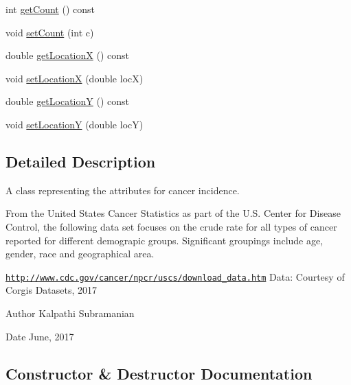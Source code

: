\begin{DoxyCompactItemize}
\item 
int \mbox{\hyperlink{classbridges_1_1_cancer_incidence_a95d3f5e77f0b6e8379e8491a4f700a2d}{get\+Count}} () const
\item 
void \mbox{\hyperlink{classbridges_1_1_cancer_incidence_a5fd30ffcf94f61cbca49112332ae4e94}{set\+Count}} (int c)
\item 
double \mbox{\hyperlink{classbridges_1_1_cancer_incidence_a3e38c05364a4135319b49fec8e1ded96}{get\+LocationX}} () const
\item 
void \mbox{\hyperlink{classbridges_1_1_cancer_incidence_a6f7ec674c626e932378f01e08178d1fb}{set\+LocationX}} (double locX)
\item 
double \mbox{\hyperlink{classbridges_1_1_cancer_incidence_a6fc0c5d9a6adff2a58b16463d3fa1c52}{get\+LocationY}} () const
\item 
void \mbox{\hyperlink{classbridges_1_1_cancer_incidence_a8ca0a21c2c5153b11adf6712e6648579}{set\+LocationY}} (double locY)
\end{DoxyCompactItemize}


\subsection{Detailed Description}
A class representing the attributes for cancer incidence. 

From the United States Cancer Statistics as part of the U.\+S. Center for Disease Control, the following data set focuses on the crude rate for all types of cancer reported for different demograpic groups. Significant groupings include age, gender, race and geographical area.

\href{http://www.cdc.gov/cancer/npcr/uscs/download_data.htm}{\tt http\+://www.\+cdc.\+gov/cancer/npcr/uscs/download\+\_\+data.\+htm} Data\+: Courtesy of Corgis Datasets, 2017

\begin{DoxyAuthor}{Author}
Kalpathi Subramanian 
\end{DoxyAuthor}
\begin{DoxyDate}{Date}
June, 2017 
\end{DoxyDate}


\subsection{Constructor \& Destructor Documentation}
\mbox{\label{classbridges_1_1_cancer_incidence_a3f5bb34394a22169bb4465c07e50fba1}} 
